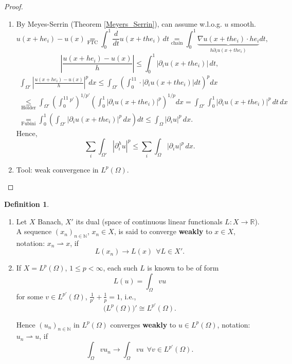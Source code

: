 \documentclass[12pt]{article}
\theoremstyle{definition}
\newtheorem{definition}{Definition}[section]
\begin{document}
\begin{proof}
\begin{enumerate}[label=(\roman*)]
\item By Meyes-Serrin (Theorem \ref{Meyers_Serrin}), can assume w.l.o.g. $u$ smooth.
\[u(x+he_i)-u(x)\underset{\text{FTC}}{=}\int_0^1\frac{d}{dt}u(x+the_i)\,dt\underset{\text{chain}}{=}\int_0^1\underbrace{\nabla u(x+the_i)\cdot he_i}_{h\partial_iu(x+the_i)}dt,\]
\[\left|\frac{u(x+he_i)-u(x)}{h}\right|\leq\int_0^1\big|\partial_iu(x+the_i)\big|\,dt,\]
\begin{multline*}
\int_{\Omega'}\left|\frac{u(x+he_i)-u(x)}{h}\right|^pdx\leq\int_{\Omega'}\left(\int_0^11\cdot\big|\partial_iu(x+the_i)\big|dt\right)^pdx\\
\underset{\text{H\"{o}lder}}{\leq}\int_{\Omega'}\left(\int_0^11^{p'}\right)^{1/p'}\left(\int_0^1\big|\partial_iu(x+the_i)\big|^p\right)^{1/p}dx=\int_{\Omega'}\int_0^1\big|\partial_iu(x+the_i)\big|^p\,dt\,dx\\
\underset{\text{Fubini}}{=}\int_0^1\left(\int_{\Omega'}\big|\partial_iu(x+the_i)\big|^p\,dx\right)dt\leq\int_{\Omega}|\partial_iu|^p\,dx.
\end{multline*}
Hence,
\[\sum_i\int_{\Omega'}|\partial_i^hu|^p\leq\sum_i\int_{\Omega}|\partial_iu|^p\,dx.\]

\item Tool: weak convergence in $L^p(\Omega)$.
\end{enumerate}
\end{proof}

\begin{definition}
\begin{enumerate}[label=\alph*)]
\item Let $X$ Banach, $X'$ its dual (space of continuous linear functionals $L:X\rightarrow\mathbb{R}$). A sequence $(x_n)_{n\in\mathbb{N}}$, $x_n\in X$, is said to converge \textbf{weakly} to $x\in X$, notation: $x_n\rightharpoonup x$, if
\[L(x_n)\longrightarrow L(x)\ \ \forall L\in X'.\]

\item If $X=L^p(\Omega)$, $1\leq p<\infty$, each such $L$ is known to be of form
\[L(u)=\int_{\Omega}vu\]
for some $v\in L^{p'}(\Omega)$, $\frac{1}{p'}+\frac{1}{p}=1$, i.e.,
\[\big(L^p(\Omega)\big)'\cong L^{p'}(\Omega).\]

Hence $(u_n)_{n\in\mathbb{N}}$ in $L^p(\Omega)$ converges \textbf{weakly} to $u\in L^p(\Omega)$, notation: $u_n\rightharpoonup u$, if
\[\int_{\Omega}vu_n\longrightarrow\int_{\Omega}vu\ \ \forall v\in L^{p'}(\Omega).\]
\end{enumerate}
\end{definition}
\end{document}
